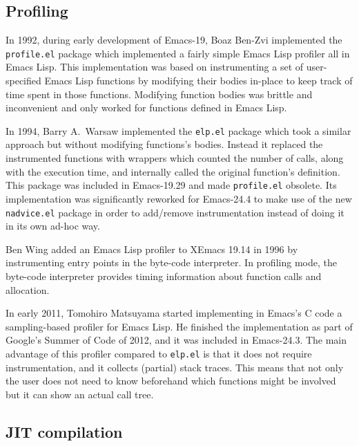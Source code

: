 \documentclass[format=acmsmall, review]{acmart}
\newcommand \Elisp {Emacs Lisp}
\begin{document}
\subsection{Profiling}
\label{sec:profiler}

In 1992, during early development of Emacs-19, Boaz Ben-Zvi implemented the
\texttt{profile.el} package which implemented a fairly simple \Elisp{}
profiler all in \Elisp{}.  This implementation was based on instrumenting
a set of user-specified \Elisp{} functions by modifying their bodies in-place
to keep track of time spent in those functions. Modifying function
bodies was brittle and inconvenient and only worked for functions
defined in \Elisp.

In 1994, Barry A.~Warsaw implemented the \texttt{elp.el} package which took
a similar approach but without modifying functions's bodies.
Instead it replaced the instrumented functions with wrappers which counted
the number of calls, along with the execution time, and internally called
the original function's definition.  This package was included in
Emacs-19.29 and made \texttt{profile.el} obsolete.  Its implementation was
significantly reworked for Emacs-24.4 to make use of the new
\texttt{nadvice.el} package in order to add/remove instrumentation instead
of doing it in its own ad-hoc way.

Ben Wing added an \Elisp{} profiler to XEmacs 19.14 in
1996 by instrumenting entry points in the byte-code interpreter.
In profiling mode, the byte-code interpreter provides timing
information about function calls and allocation.

In early 2011, Tomohiro Matsuyama started implementing in Emacs's C code
a sampling-based profiler for \Elisp{}.  He finished the implementation as
part of Google's Summer of Code of 2012, and it was included in Emacs-24.3.
The main advantage of this profiler compared to \texttt{elp.el} is that it
does not require instrumentation, and it collects (partial) stack traces.
This means that not only the user does not need to know beforehand which
functions might be involved but it can show an actual call tree.

\subsection{JIT compilation}
\label{sec:jit}
\end{document}
